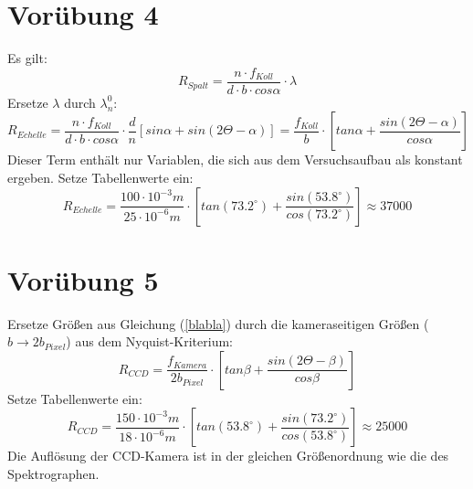 \documentclass[titlepage]{scrartcl}
\begin{document}
\section{Vorübung 4}
Es gilt:
\begin{equation}
R_{Spalt} = \frac{n\cdot f_{Koll}}{d\cdot b\cdot cos \alpha}\cdot \lambda
\end{equation}
Ersetze $\lambda$ durch $\lambda_n^0$:
\begin{equation}
R_{Echelle} = \frac{n\cdot f_{Koll}}{d\cdot b\cdot cos \alpha}\cdot \frac{d}{n}[sin \alpha + sin(2\Theta-\alpha)] = \frac{f_{Koll}}{b}\cdot [tan \alpha + \frac{sin(2\Theta-\alpha)}{cos \alpha}]
\label{blabla}
\end{equation}
Dieser Term enthält nur Variablen, die sich aus dem Versuchsaufbau als konstant ergeben. 
Setze Tabellenwerte ein:
\begin{equation}
R_{Echelle} = \frac{100 \cdot 10^{-3}m}{25 \cdot 10^{-6}m}\cdot [tan (73.2^{\circ}) + \frac{sin(53.8^{\circ})}{cos (73.2^{\circ})}] \approx 37000
\end{equation}
\section{Vorübung 5}
Ersetze Größen aus Gleichung (\ref{blabla}) durch die kameraseitigen Größen ($b \rightarrow 2b_{Pixel}$) aus dem Nyquist-Kriterium:
\begin{equation}
R_{CCD} = \frac{f_{Kamera}}{2b_{Pixel}}\cdot [tan \beta + \frac{sin(2\Theta-\beta)}{cos \beta}]
\end{equation}
Setze Tabellenwerte ein:
\begin{equation}
R_{CCD} = \frac{150\cdot10^{-3}m}{18\cdot10^{-6}m}\cdot [tan (53.8^{\circ}) + \frac{sin(73.2^{\circ})}{cos (53.8^{\circ})}] \approx 25000
\end{equation}
Die Auflösung der CCD-Kamera ist in der gleichen Größenordnung wie die des Spektrographen. 
\end{document}
